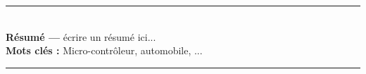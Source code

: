 \documentclass[a4paper,12pt,openany]{book}
\makeatletter
\def\cleardoublepage{\clearpage\if@twoside \ifodd\c@page\else%
  \hbox{}%
  \thispagestyle{empty}%
  \newpage%
  \if@twocolumn\hbox{}\newpage\fi\fi\fi}
\theoremstyle{break}
\makeatother
\begin{document}
\clearpage

\chapter*{}
\noindent\rule[2pt]{\textwidth}{0.5pt}\\
{\textbf{Résumé ---}}
écrire un résumé ici...
\\
{\textbf{Mots clés :}}
Micro-contrôleur, automobile, ...
\\
\noindent\rule[2pt]{\textwidth}{0.5pt}


\mainmatter
\pagestyle{fancy}
\cleardoublepage







\appendix

%



\clearpage



\clearpage
\thispagestyle{empty}
\end{document}
